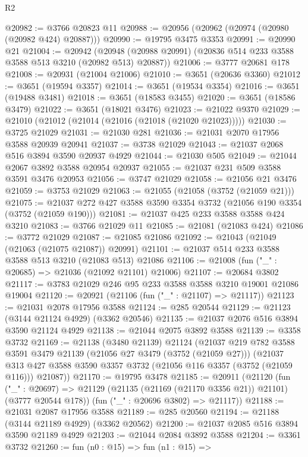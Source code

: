 \begin{lexlean}{R2}
\begin{coremodule}
@20982 := @3766 @20823 @11
@20988 := @20956 (@20962 (@20974 (@20980 (@20982 @424) @20887)))
@20990 := @19795 @3475 @3353
@20991 := @20990 @21
@21004 := @20942
    (@20948 (@20988 @20991) (@20836 @514 @233 @3588 @3588 @513 @3210 (@20982 @513) @20887))
@21006 := @3777 @20681 @178
@21008 := @20931 (@21004 @21006)
@21010 := @3651 (@20636 @3360)
@21012 := @3651 (@19594 @3357)
@21014 := @3651 (@19534 @3354)
@21016 := @3651 (@19488 @3481)
@21018 := @3651 (@18583 @3455)
@21020 := @3651 (@18586 @3479)
@21022 := @3651 (@18021 @3476)
@21023 := @21022 @9370
@21029 := @21010 (@21012 (@21014 (@21016 (@21018 (@21020 @21023)))))
@21030 := @3725 @21029
@21031 := @21030 @281
@21036 := @21031 @2070 @17956 @3588 @20939 @20941
@21037 := @3738 @21029
@21043 := @21037 @2068 @516 @3894 @3590 @20937 @4929
@21044 := @21030 @505
@21049 := @21044 @2067 @3892 @3588 @20954 @20937
@21055 := @21037 @231 @509 @3588 @3591 @3476 @20953
@21056 := @3747 @21029
@21058 := @21056 @21 @3476
@21059 := @3753 @21029
@21063 := @21055 (@21058 (@3752 (@21059 @21)))
@21075 := @21037 @272 @427 @3588 @3590 @3354 @3732 (@21056 @190 @3354 (@3752 (@21059 @190)))
@21081 := @21037 @425 @233 @3588 @3588 @424 @3210
@21083 := @3766 @21029 @11
@21085 := @21081 (@21083 @424)
@21086 := @3772 @21029
@21087 := @21085 @21086
@21092 := @21043 (@21049 (@21063 (@21075 @21087)) @20991)
@21101 := @21037 @514 @233 @3588 @3588 @513 @3210 (@21083 @513) @21086
@21106 := @21008 (fun ("_" : @20685) => @21036 (@21092 @21101) @21006)
@21107 := @20684 @3802
@21117 := @3783 @21029 @246 @95 @233 @3588 @3588 @3210 @19001 @21086 @19004
@21120 := @20921 (@21106 (fun ("_" : @21107) => @21117))
@21123 := @21031 @2078 @17956 @3588
@21124 := @285 @20544
@21129 := @21123 (@3144 @21124 @4929) (@3362 @20546)
@21135 := @21037 @2076 @516 @3894 @3590 @21124 @4929
@21138 := @21044 @2075 @3892 @3588
@21139 := @3358 @3732
@21169 := @21138
    (@3480 @21139)
    @21124
    (@21037
      @219
      @782
      @3588
      @3591
      @3479
      @21139
      (@21056 @27 @3479 (@3752 (@21059 @27)))
      (@21037 @313 @427 @3588 @3590 @3357 @3732 (@21056 @116 @3357 (@3752 (@21059 @116))) @21087))
@21170 := @19795 @3478
@21185 := @20911
    (@21120
      (fun ("_" : @20697) => @21129 (@21135 (@21169 (@21170 @3356 @21)) @21101) (@3777 @20544 @178))
      (fun ("_" : @20696 @3802) => @21117))
@21188 := @21031 @2087 @17956 @3588
@21189 := @285 @20560
@21194 := @21188 (@3144 @21189 @4929) (@3362 @20562)
@21200 := @21037 @2085 @516 @3894 @3590 @21189 @4929
@21203 := @21044 @2084 @3892 @3588
@21204 := @3361 @3732
@21260 := fun (n0 : @15) =>
  fun (n1 : @15) =>

\end{coremodule}
\end{lexlean}
